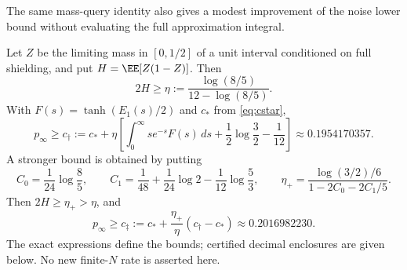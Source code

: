 \documentclass[11pt,letterpaper]{article}
\begin{document}
The same mass-query identity also gives a modest improvement of the
noise lower bound without evaluating the full approximation integral.

\begin{proposition}\label{prop:half-noise}
Let $Z$ be the limiting mass in $[0,1/2]$ of a unit interval conditioned
on full shielding, and put $H=\EE[Z(1-Z)]$. Then
\begin{equation}\label{eq:half-disagreement}
 2H\ge\eta:=\frac{\log(8/5)}{12-\log(8/5)}.
\end{equation}
With $F(s)=\tanh(E_1(s)/2)$ and $c_*$ from \eqref{eq:cstar},
\begin{equation}\label{eq:cdagger}
 p_\infty\ge c_\dagger
 :=c_*+\eta\left[
     \int_0^\infty se^{-s}F(s)\,ds
        +\frac12\log\frac32-\frac1{12}\right]
 \approx0.1954170357.
\end{equation}
A stronger bound is obtained by putting
\[
 C_0=\frac1{24}\log\frac85,\qquad
 C_1=\frac1{48}+\frac1{24}\log2-\frac1{12}\log\frac53,
 \qquad
 \eta_+=\frac{\log(3/2)/6}{1-2C_0-2C_1/5}.
\]
Then $2H\ge\eta_+>\eta$, and
\begin{equation}\label{eq:cddagger}
 p_\infty\ge c_\ddagger
 :=c_*+\frac{\eta_+}{\eta}(c_\dagger-c_*)
 \approx0.2016982230.
\end{equation}
The exact expressions define the bounds; certified decimal enclosures
are given below. No new finite-$N$ rate is asserted here.
\end{proposition}
\end{document}
